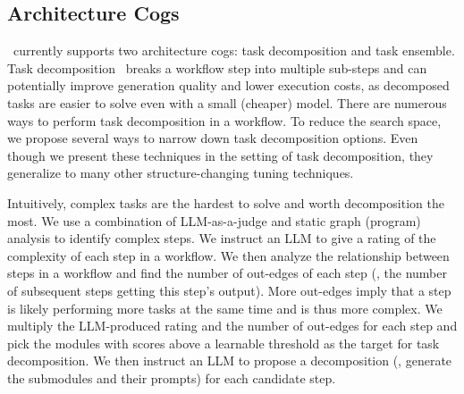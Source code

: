 \subsection{Architecture Cogs}
\label{sec:structure-cog}
\sysname\ currently supports two architecture cogs: task decomposition and task ensemble.
Task decomposition~\cite{khot2023decomposed} breaks a workflow step into multiple sub-steps and can potentially improve generation quality and lower execution costs, as decomposed tasks are easier to solve even with a small (cheaper) model.
There are numerous ways to perform task decomposition in a workflow. 
To reduce the search space, we propose several ways to narrow down task decomposition options. Even though we present these techniques in the setting of task decomposition, they generalize to many other structure-changing tuning techniques.

Intuitively, complex tasks are the hardest to solve and worth decomposition the most. We use a combination of LLM-as-a-judge \cite{vicuna_share_gpt} and static graph (program) analysis to identify complex steps. We instruct an LLM to give a rating of the complexity of each step in a workflow. We then analyze the relationship between steps in a workflow and find the number of out-edges of each step (\ie, the number of subsequent steps getting this step's output). More out-edges imply that a step is likely performing more tasks at the same time and is thus more complex. We multiply the LLM-produced rating and the number of out-edges for each step and pick the modules with scores above a learnable threshold as the target for task decomposition. We then instruct an LLM to propose a decomposition (\ie, generate the submodules and their prompts) for each candidate step. %

